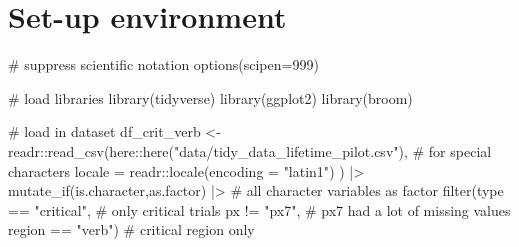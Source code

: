 \documentclass[
  letterpaper,
  DIV=11,
  numbers=noendperiod]{scrartcl}
\newenvironment{Shaded}{\begin{snugshade}}{\end{snugshade}}
\newcommand{\AttributeTok}[1]{\textcolor[rgb]{0.40,0.45,0.13}{#1}}
\newcommand{\CommentTok}[1]{\textcolor[rgb]{0.37,0.37,0.37}{#1}}
\newcommand{\DecValTok}[1]{\textcolor[rgb]{0.68,0.00,0.00}{#1}}
\newcommand{\FunctionTok}[1]{\textcolor[rgb]{0.28,0.35,0.67}{#1}}
\newcommand{\NormalTok}[1]{\textcolor[rgb]{0.00,0.23,0.31}{#1}}
\newcommand{\OtherTok}[1]{\textcolor[rgb]{0.00,0.23,0.31}{#1}}
\newcommand{\SpecialCharTok}[1]{\textcolor[rgb]{0.37,0.37,0.37}{#1}}
\newcommand{\StringTok}[1]{\textcolor[rgb]{0.13,0.47,0.30}{#1}}
\begin{document}
\begin{Shaded}
\end{Shaded}

\hypertarget{set-up-environment}{%
\section{Set-up environment}\label{set-up-environment}}

\begin{Shaded}
\begin{Highlighting}[]
\CommentTok{\# suppress scientific notation}
\FunctionTok{options}\NormalTok{(}\AttributeTok{scipen=}\DecValTok{999}\NormalTok{)}

\CommentTok{\# load libraries}
\FunctionTok{library}\NormalTok{(tidyverse)}
\FunctionTok{library}\NormalTok{(ggplot2)}
\FunctionTok{library}\NormalTok{(broom)}
\end{Highlighting}
\end{Shaded}

\begin{Shaded}
\begin{Highlighting}[]
\CommentTok{\# load in dataset}
\NormalTok{df\_crit\_verb }\OtherTok{\textless{}{-}}\NormalTok{ readr}\SpecialCharTok{::}\FunctionTok{read\_csv}\NormalTok{(here}\SpecialCharTok{::}\FunctionTok{here}\NormalTok{(}\StringTok{"data/tidy\_data\_lifetime\_pilot.csv"}\NormalTok{), }
                               \CommentTok{\# for special characters}
                               \AttributeTok{locale =}\NormalTok{ readr}\SpecialCharTok{::}\FunctionTok{locale}\NormalTok{(}\AttributeTok{encoding =} \StringTok{"latin1"}\NormalTok{) }
\NormalTok{                               ) }\SpecialCharTok{|\textgreater{}} 
  \FunctionTok{mutate\_if}\NormalTok{(is.character,as.factor) }\SpecialCharTok{|\textgreater{}} \CommentTok{\# all character variables as factor}
  \FunctionTok{filter}\NormalTok{(type }\SpecialCharTok{==} \StringTok{"critical"}\NormalTok{, }\CommentTok{\# only critical trials}
\NormalTok{         px }\SpecialCharTok{!=} \StringTok{"px7"}\NormalTok{, }\CommentTok{\# px7 had a lot of missing values}
\NormalTok{         region }\SpecialCharTok{==} \StringTok{"verb"}\NormalTok{) }\CommentTok{\# critical region only}
\end{Highlighting}
\end{Shaded}
\end{document}
